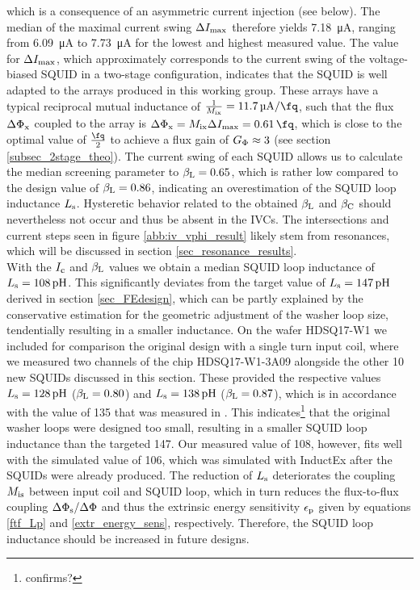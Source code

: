 which is a consequence of an asymmetric current injection (see below). The median of the maximal current swing $\Delta I_{\rm max}$ therefore yields \qty{7.18}{\micro\ampere}, ranging from \qty{6.09}{\micro\ampere} to \qty{7.73}{\micro\ampere} for the lowest and highest measured value. The value for $\Delta I_{\rm max}$, which approximately corresponds to the current swing of the voltage-biased SQUID in a two-stage configuration, indicates that the SQUID is well adapted to the arrays produced in this working group. These arrays have a typical reciprocal mutual inductance of $\frac{1}{M_{\rm ix}}=\qty{11.7}{\micro\ampere\per\fq}$, such that the flux $\Delta\Phi_{\rm x}$ coupled to the array is $\Delta\Phi_{\rm x}=M_{\rm ix}\Delta I_{\rm max}=\qty{0.61}{\fq}$, which is close to the optimal value of $\frac{\unit{\fq}}{2}$ to achieve a flux gain of $G_{\rm \Phi}\approx 3$ (see section \ref{subsec_2stage_theo}). The current swing of each SQUID allows us to calculate the median screening parameter to $\beta_{\rm L}=0.65$, which is rather low compared to the design value of $\beta_{\rm L}=0.86$, indicating an overestimation of the SQUID loop inductance $L_{\rm s}$. Hysteretic behavior related to the obtained $\beta_{\rm L}$ and $\beta_{\rm C}$ should nevertheless not occur and thus be absent in the IVCs. The intersections and current steps seen in figure \ref{abb:iv_vphi_result} likely stem from resonances, which will be discussed in section \ref{sec_resonance_results}. \\ 

With the $I_{\rm c}$ and $\beta_{\rm L}$ values we obtain a median SQUID loop inductance of $L_{\rm s}=\qty{108}{\pico\henry}$. This significantly deviates from the target value of $L_{\rm s}=\qty{147}{\pico\henry}$ derived in section \ref{sec_FEdesign}, which can be partly explained by the conservative estimation for the geometric adjustment of the washer loop size, tendentially resulting in a smaller inductance.  On the wafer HDSQ17-W1 we included for comparison the original design with a single turn input coil, where we measured two channels of the chip HDSQ17-W1-3A09 alongside the other 10 new SQUIDs discussed in this section. These provided the respective values $L_{\rm s}=\qty{128}{\pico\henry}$ ($\beta_{\rm L}=0.80$) and $L_{\rm s}=\qty{138}{\pico\henry}$ ($\beta_{\rm L}=0.87$), which is in accordance with the value of \qty{135}{\pH} that was measured in \cite{Bauer2022}. This indicates\footnote{confirms?} that the original washer loops were designed too small, resulting in a smaller SQUID loop inductance than the targeted \qty{147}{\pH}. Our measured value of \qty{108}{\pH}, however, fits well with the simulated value of \qty{106}{\pH}, which was simulated with InductEx after the SQUIDs were already produced. The reduction of $L_{\rm s}$ deteriorates the coupling $M_{\rm is}$ between input coil and SQUID loop, which in turn reduces the flux-to-flux coupling $\Delta\Phi_{\rm s}/\Delta\Phi$ and thus the extrinsic energy sensitivity $\epsilon_{\rm p}$ given by equations \ref{ftf_Lp} and \ref{extr_energy_sens}, respectively. Therefore, the SQUID loop inductance should be increased in future designs. \\
 
